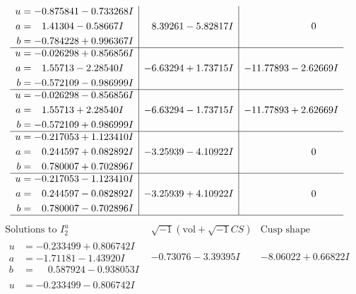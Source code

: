 \documentclass[1p]{elsarticle_modified}
\theoremstyle{definition}
\newcommand{\I}{\sqrt{-1}}
\begin{document}
$$\begin{array}{c|c|c}
\begin{aligned}
u &= -0.875841 - 0.733268 I \\
a &= \phantom{-}1.41304 - 0.58667 I \\
b &= -0.784228 + 0.996367 I\end{aligned}
 & \phantom{-}8.39261 - 5.82817 I & \phantom{-0.000000 } 0 \\ \hline\begin{aligned}
u &= -0.026298 + 0.856856 I \\
a &= \phantom{-}1.55713 - 2.28540 I \\
b &= -0.572109 - 0.986999 I\end{aligned}
 & -6.63294 + 1.73715 I & -11.77893 - 2.62669 I \\ \hline\begin{aligned}
u &= -0.026298 - 0.856856 I \\
a &= \phantom{-}1.55713 + 2.28540 I \\
b &= -0.572109 + 0.986999 I\end{aligned}
 & -6.63294 - 1.73715 I & -11.77893 + 2.62669 I \\ \hline\begin{aligned}
u &= -0.217053 + 1.123410 I \\
a &= \phantom{-}0.244597 + 0.082892 I \\
b &= \phantom{-}0.780007 + 0.702896 I\end{aligned}
 & -3.25939 - 4.10922 I & \phantom{-0.000000 } 0 \\ \hline\begin{aligned}
u &= -0.217053 - 1.123410 I \\
a &= \phantom{-}0.244597 - 0.082892 I \\
b &= \phantom{-}0.780007 - 0.702896 I\end{aligned}
 & -3.25939 + 4.10922 I & \phantom{-0.000000 } 0\\
 \hline 
 \end{array}$$\newpage$$\begin{array}{c|c|c}  
\text{Solutions to }I^u_{2}& \I (\text{vol} + \sqrt{-1}CS) & \text{Cusp shape}\\
 \hline 
\begin{aligned}
u &= -0.233499 + 0.806742 I \\
a &= -1.71181 - 1.43920 I \\
b &= \phantom{-}0.587924 - 0.938053 I\end{aligned}
 & -0.73076 - 3.39395 I & -8.06022 + 0.66822 I \\ \hline\begin{aligned}
u &= -0.233499 - 0.806742 I \\

\end{aligned}
\end{array}$$
\end{document}

